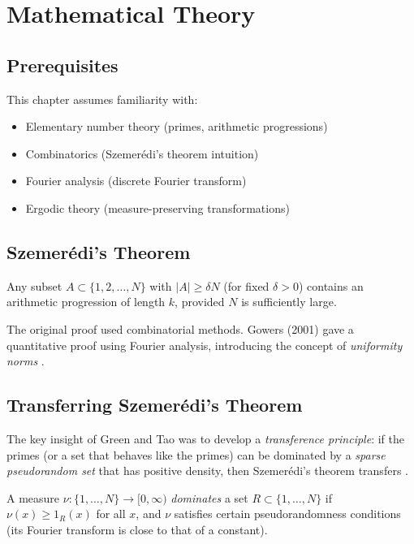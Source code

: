 \section{Mathematical Theory}


\subsection{Prerequisites}
This chapter assumes familiarity with:
\begin{itemize}
\item Elementary number theory (primes, arithmetic progressions)
\item Combinatorics (Szemer\'edi's theorem intuition)
\item Fourier analysis (discrete Fourier transform)
\item Ergodic theory (measure-preserving transformations)
\end{itemize}

\subsection{Szemer\'edi's Theorem}

\begin{theorem}
Any subset $A \subset \{1, 2, \ldots, N\}$ with $|A| \geq \delta N$ (for fixed $\delta > 0$) contains an arithmetic progression of length $k$, provided $N$ is sufficiently large.
\end{theorem}

The original proof used combinatorial methods. Gowers (2001) gave a quantitative proof using Fourier analysis, introducing the concept of \emph{uniformity norms} \cite{gowers2001}.

\subsection{Transferring Szemer\'edi's Theorem}

The key insight of Green and Tao was to develop a \emph{transference principle}: if the primes (or a set that behaves like the primes) can be dominated by a \emph{sparse pseudorandom set} that has positive density, then Szemer\'edi's theorem transfers \cite{greentao2008}.

\begin{definition}
A measure $\nu: \{1, \ldots, N\} \to [0, \infty)$ \emph{dominates} a set $R \subset \{1, \ldots, N\}$ if $\nu(x) \geq 1_R(x)$ for all $x$, and $\nu$ satisfies certain pseudorandomness conditions (its Fourier transform is close to that of a constant).
\end{definition}

